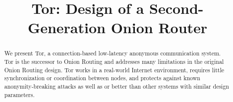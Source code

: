 \documentclass[times,10pt,twocolumn]{article}
\begin{document}

\title{Tor: Design of a Second-Generation Onion Router}


\maketitle
\thispagestyle{empty}

\begin{abstract}
We present Tor, a connection-based low-latency anonymous communication
system. Tor is the successor to Onion Routing
and addresses many limitations in the original Onion Routing design.
Tor works in a real-world Internet environment,
requires little synchronization or coordination between nodes, and
protects against known anonymity-breaking attacks as well
as or better than other systems with similar design parameters.
\end{abstract}



\label{sec:intro}
\end{document}

